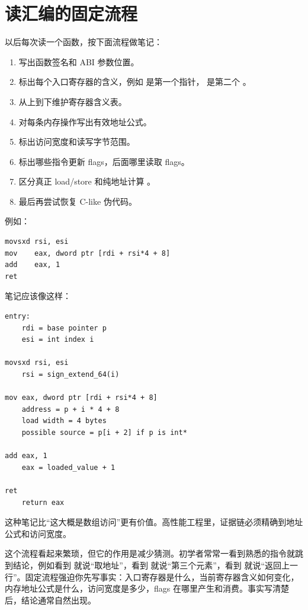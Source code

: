 \section{读汇编的固定流程}

以后每次读一个函数，按下面流程做笔记：

\begin{enumerate}
  \item 写出函数签名和 ABI 参数位置。
  \item 标出每个入口寄存器的含义，例如  是第一个指针， 是第二个 。
  \item 从上到下维护寄存器含义表。
  \item 对每条内存操作写出有效地址公式。
  \item 标出访问宽度和读写字节范围。
  \item 标出哪些指令更新 flags，后面哪里读取 flags。
  \item 区分真正 load/store 和纯地址计算 。
  \item 最后再尝试恢复 C-like 伪代码。
\end{enumerate}

例如：

\begin{lstlisting}
movsxd rsi, esi
mov    eax, dword ptr [rdi + rsi*4 + 8]
add    eax, 1
ret
\end{lstlisting}

笔记应该像这样：

\begin{lstlisting}
entry:
    rdi = base pointer p
    esi = int index i

movsxd rsi, esi
    rsi = sign_extend_64(i)

mov eax, dword ptr [rdi + rsi*4 + 8]
    address = p + i * 4 + 8
    load width = 4 bytes
    possible source = p[i + 2] if p is int*

add eax, 1
    eax = loaded_value + 1

ret
    return eax
\end{lstlisting}

这种笔记比“这大概是数组访问”更有价值。高性能工程里，证据链必须精确到地址公式和访问宽度。

这个流程看起来繁琐，但它的作用是减少猜测。初学者常常一看到熟悉的指令就跳到结论，例如看到  就说“取地址”，看到  就说“第三个元素”，看到  就说“返回上一行”。固定流程强迫你先写事实：入口寄存器是什么，当前寄存器含义如何变化，内存地址公式是什么，访问宽度是多少，flags 在哪里产生和消费。事实写清楚后，结论通常自然出现。

